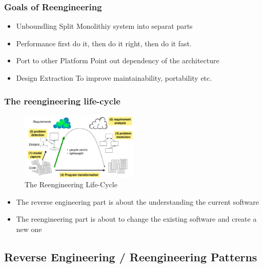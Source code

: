 \hypertarget{goals-of-reengineering}{%
\subsubsection{Goals of Reengineering}\label{goals-of-reengineering}}
\begin{itemize}
    \item Unboundling
    \subitem Split Monolithiy system into separat parts
    \item Performance
    \subitem first do it, then do it right, then do it fast.
    \item Port to other Platform
    \subitem Point out dependency of the architecture
    \item Design Extraction
    \subitem To improve maintainability, portability etc.
\end{itemize}


\hypertarget{the-reengineering-life-cycle}{%
\subsubsection{The reengineering
life-cycle}\label{the-reengineering-life-cycle}}

\begin{figure}[H]
\centering
\includegraphics[width=0.5\textwidth]{figures/reengineeringLifecycle.png}
\caption{The Reengineering Life-Cycle}
\end{figure}

\begin{itemize}
\tightlist
\item
  The reverse engineering part is about the understanding the current
  software
\item
  The reengineering part is about to change the existing software and
  create a new one
\end{itemize}

\hypertarget{reverse-engineering-reengineering-patterns}{%
\subsection{Reverse Engineering / Reengineering
Patterns}\label{reverse-engineering-reengineering-patterns}}

